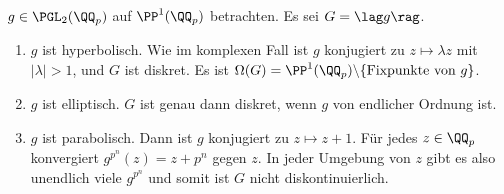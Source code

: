 \begin{enumerate}
$g\in\PGL_2(\QQ_p)$ auf $\PP^1(\QQ_p)$ betrachten.
Es sei $G=\lag g\rag$.
\begin{enumerate}
\item $g$ ist hyperbolisch. Wie im komplexen Fall ist $g$ konjugiert
zu $z\mapsto\lambda z$ mit $|\lambda|>1$, und $G$ ist diskret.
Es ist $\Omega(G)=\PP^1(\QQ_p)\backslash\{\text{Fixpunkte von }g\}$.
\item $g$ ist elliptisch. $G$ ist genau dann diskret, wenn
$g$ von endlicher Ordnung ist.
\item $g$ ist parabolisch. Dann ist $g$ konjugiert zu $z\mapsto z+1$.
Für jedes $z\in\QQ_p$ konvergiert $g^{p^n}(z)=z+p^n$ gegen $z$.
In jeder Umgebung von $z$ gibt es also unendlich viele $g^{p^n}$
und somit ist $G$ nicht diskontinuierlich.
\end{enumerate}
\end{enumerate}

